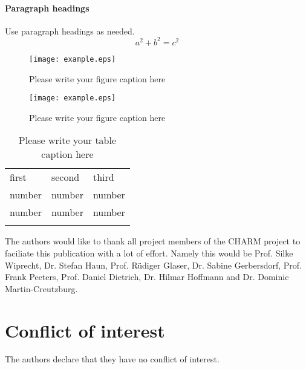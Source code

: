 \paragraph{Paragraph headings} Use paragraph headings as needed.
\begin{equation}
a^2+b^2=c^2
\end{equation}

\begin{figure}
  \texttt{[image: example.eps]}
\caption{Please write your figure caption here}
\label{fig:1}       %
\end{figure}
%
\begin{figure*}
  \texttt{[image: example.eps]}
\caption{Please write your figure caption here}
\label{fig:2}       %
\end{figure*}
%
\begin{table}
\caption{Please write your table caption here}
\label{tab:1}       %
\begin{tabular}{lll}
\hline\noalign{\smallskip}
first & second & third  \\
\noalign{\smallskip}\hline\noalign{\smallskip}
number & number & number \\
number & number & number \\
\noalign{\smallskip}\hline
\end{tabular}
\end{table}


\begin{acknowledgements}
The authors would like to thank all project members of the CHARM project to faciliate this publication with a lot of effort. Namely this would be Prof. Silke Wiprecht, Dr. Stefan Haun, Prof. Rüdiger Glaser, Dr. Sabine Gerbersdorf, Prof. Frank Peeters, Prof. Daniel Dietrich, Dr. Hilmar Hoffmann and Dr. Dominic Martin-Creutzburg.
\end{acknowledgements}


%
\section*{Conflict of interest}
The authors declare that they have no conflict of interest.



